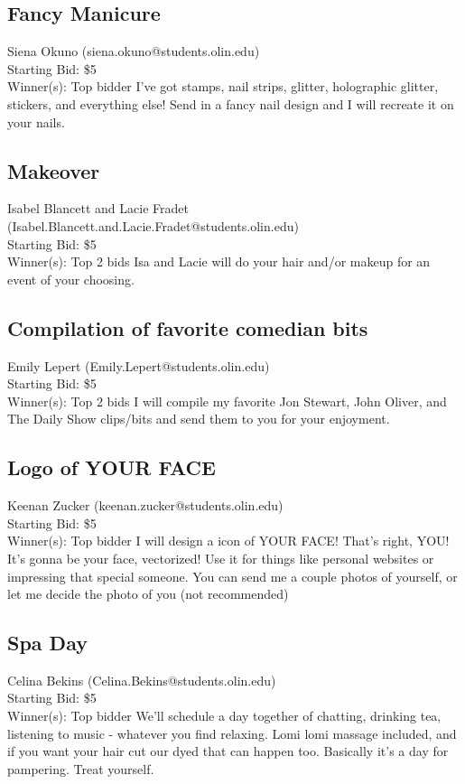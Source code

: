 \documentclass[11pt]{article}
\begin{document}
\subsection{Fancy Manicure}
Siena Okuno (siena.okuno@students.olin.edu) \\
Starting Bid: \$5 \\
Winner(s): 
Top bidder\newline
I've got stamps, nail strips, glitter, holographic glitter, stickers, and everything else! Send in a fancy nail design and I will recreate it on your nails.
\subsection{Makeover}
Isabel Blancett and Lacie Fradet (Isabel.Blancett.and.Lacie.Fradet@students.olin.edu) \\
Starting Bid: \$5 \\
Winner(s): 
Top 2 bids\newline
Isa and Lacie will do your hair and/or makeup for an event of your choosing.
\subsection{Compilation of favorite comedian bits}
Emily Lepert (Emily.Lepert@students.olin.edu) \\
Starting Bid: \$5 \\
Winner(s): 
Top 2 bids\newline
I will compile my favorite Jon Stewart, John Oliver, and The Daily Show clips/bits and send them to you for your enjoyment.
\subsection{Logo of YOUR FACE}
Keenan Zucker (keenan.zucker@students.olin.edu) \\
Starting Bid: \$5 \\
Winner(s): 
Top bidder\newline
I will design a icon of YOUR FACE! That's right, YOU! It's gonna be your face, vectorized! Use it for things like personal websites or impressing that special someone. You can send me a couple photos of yourself, or let me decide the photo of you (not recommended)
\subsection{Spa Day}
Celina Bekins (Celina.Bekins@students.olin.edu) \\
Starting Bid: \$5 \\
Winner(s): 
Top bidder\newline
We'll schedule a day together of chatting, drinking tea, listening to music - whatever you find relaxing. Lomi lomi massage included, and if you want your hair cut our dyed that can happen too. Basically it's a day for pampering. Treat yourself.
\end{document}
